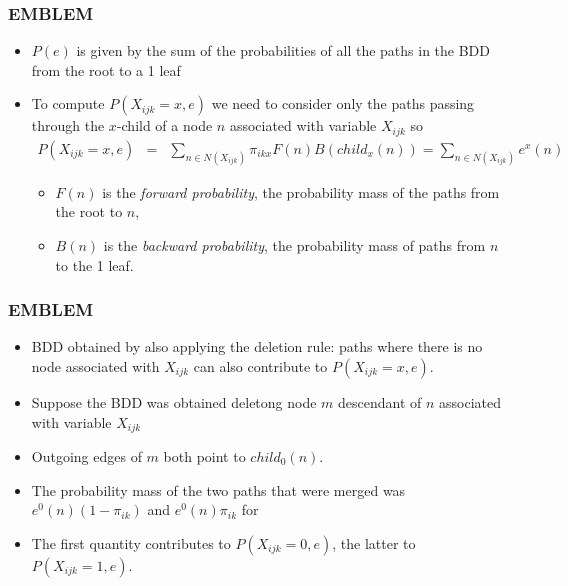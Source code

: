 \documentclass[trans,aspectratio=1610]{beamer}
\begin{document}
\begin{frame}
 \frametitle{EMBLEM}
 \begin{itemize}
\item $P(e)$ is given by the sum of the probabilities of all the paths in the BDD from the root to a 1 leaf
\item 
To compute $P(X_{ijk}=x,e)$ we  need to consider only the paths passing through the
$x$-child of a node $n$ associated with variable $X_{ijk}$ so
\begin{eqnarray*}
P(X_{ijk}=x,e)
&=&\sum_{n\in N(X_{ijk})}\pi_{ikx}F(n)B(child_x(n))=\sum_{n\in N(X_{ijk})}e^x(n)
\end{eqnarray*}
 \begin{itemize}
\item 
$F(n)$ is the \emph{forward probability}, the probability mass of the paths from the root to $n$, 
\item $B(n)$ is the \emph{backward probability}, the 
 probability mass of paths from $n$ to the 1 leaf.
\end{itemize}
\end{itemize}
\end{frame}
\begin{frame}
 \frametitle{EMBLEM}
 \begin{itemize}
\item
BDD obtained by also applying  the deletion rule: paths where there is no node associated with $X_{ijk}$ can also contribute to $P(X_{ijk}=x,e)$.
\item Suppose the BDD was obtained deletong node $m$ descendant of $n$ associated with variable $X_{ijk}$ 
\item Outgoing edges of $m$ both point to $child_0(n)$. 
\item The probability mass of the two paths that were merged was $e^0(n)(1-\pi_{ik})$ and $e^0(n)\pi_{ik}$ for 
\item The first quantity contributes to 
$P(X_{ijk}=0,e)$, the latter to $P(X_{ijk}=1,e)$.
\end{itemize}
\end{frame}
\end{document}

